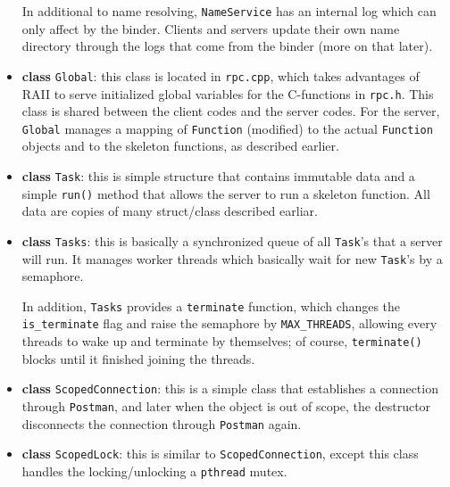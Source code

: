 \begin{itemize}
In additional to name resolving, {\tt NameService} has an internal log which can only affect by the binder.
Clients and servers update their own name directory through the logs that come from the binder (more on that later).

\item
{\bf class} {\tt Global}: this class is located in {\tt rpc.cpp}, which takes advantages of RAII to serve initialized global variables for the C-functions in {\tt rpc.h}.
This class is shared between the client codes and the server codes.
For the server, {\tt Global} manages a mapping of {\tt Function} (modified) to the actual {\tt Function} objects and to the skeleton functions, as described earlier.

\item
{\bf class} {\tt Task}: this is simple structure that contains immutable data and a simple {\tt run()} method that allows the server to run a skeleton function.
All data are copies of many struct/class described earliar.

\item
{\bf class} {\tt Tasks}: this is basically a synchronized queue of all {\tt Task}'s that a server will run.
It manages worker threads which basically wait for new {\tt Task}'s by a semaphore.

In addition, {\tt Tasks} provides a {\tt terminate{}} function, which changes the {\tt is\_terminate} flag and raise the semaphore by {\tt MAX\_THREADS}, allowing every threads to wake up and terminate by themselves; of course, {\tt terminate()} blocks until it finished joining the threads.

\item
{\bf class} {\tt ScopedConnection}: this is a simple class that establishes a connection through {\tt Postman}, and later when the object is out of scope, the destructor disconnects the connection through {\tt Postman} again.

\item
{\bf class} {\tt ScopedLock}: this is similar to {\tt ScopedConnection}, except this class handles the locking/unlocking a {\tt pthread} mutex.

\end{itemize}
